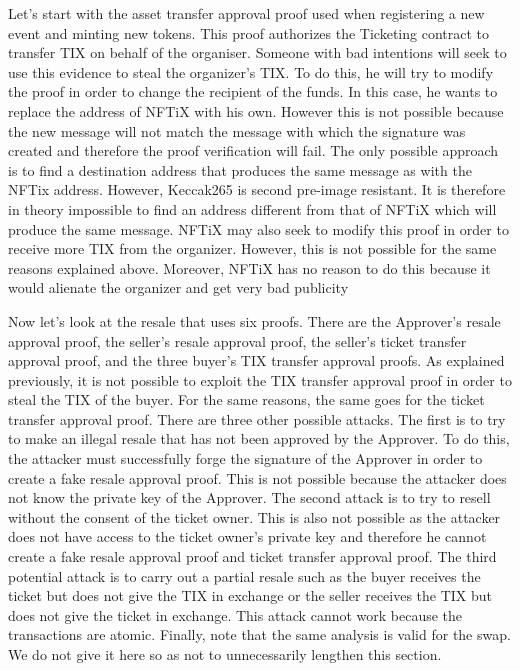 \documentclass[a4paper,11pt,oneside]{report}
\begin{document}
Let's start with the asset transfer approval proof used when registering a new event and minting new tokens. This proof authorizes the Ticketing contract to transfer TIX on behalf of the organiser. Someone with bad intentions will seek to use this evidence to steal the organizer's TIX. To do this, he will try to modify the proof in order to change the recipient of the funds. In this case, he wants to replace the address of NFTiX with his own. However this is not possible because the new message will not match the message with which the signature was created and therefore the proof verification will fail. The only possible approach is to find a destination address that produces the same message as with the NFTix address. However, Keccak265 is second pre-image resistant. It is therefore in theory impossible to find an address different from that of NFTiX which will produce the same message. NFTiX may also seek to modify this proof in order to receive more TIX from the organizer. However, this is not possible for the same reasons explained above. Moreover, NFTiX has no reason to do this because it would alienate the organizer and get very bad publicity 

Now let's look at the resale that uses six proofs. There are the Approver's resale approval proof, the seller's resale approval proof, the seller's ticket transfer approval proof, and the three buyer's TIX transfer approval proofs. As explained previously, it is not possible to exploit the TIX transfer approval proof in order to steal the TIX of the buyer. For the same reasons, the same goes for the ticket transfer approval proof. There are three other possible attacks. The first is to try to make an illegal resale that has not been approved by the Approver. To do this, the attacker must successfully forge the signature of the Approver in order to create a fake resale approval proof. This is not possible because the attacker does not know the private key of the Approver. The second attack is to try to resell without the consent of the ticket owner. This is also not possible as the attacker does not have access to the ticket owner's private key and therefore he cannot create a fake resale approval proof and ticket transfer approval proof. The third potential attack is to carry out a partial resale such as the buyer receives the ticket but does not give the TIX in exchange or the seller receives the TIX but does not give the ticket in exchange. This attack cannot work because the transactions are atomic. Finally, note that the same analysis is valid for the swap. We do not give it here so as not to unnecessarily lengthen this section.
\end{document}
